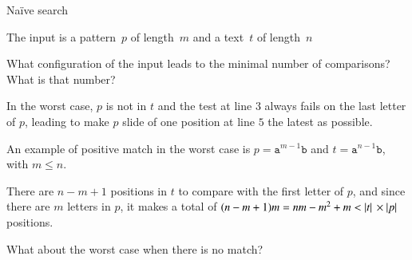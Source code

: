 %
\begin{frame}{Naïve search}

The input is a pattern~\(p\) of length~\(m\) and a text~\(t\) of
length~\(n\)

\bigskip

What configuration of the input leads to the minimal number of
comparisons? What is that number?

\bigskip

In the worst case, \(p\) is not in \(t\) and the test at line \(3\)
always fails on the last letter of \(p\), leading to make \(p\)
slide of one position at line \(5\) the latest as possible.

\bigskip

An example of positive match in the worst case is \(p =
\texttt{a}^{m-1}\texttt{b}\) and \(t = \texttt{a}^{n-1}\texttt{b}\),
with \(m \leq n\).

\bigskip

There are \(n - m + 1\) positions in \(t\) to compare with the first
letter of \(p\), and since there are \(m\) letters in \(p\), it makes
a total of \((n - m + 1) m = nm - m^2 + m < \left\lvert\smash{t}\right\rvert{} \times \left\lvert\smash{p}\right\rvert{}\)
positions.

\bigskip

What about the worst case when there is no match?

\end{frame}
